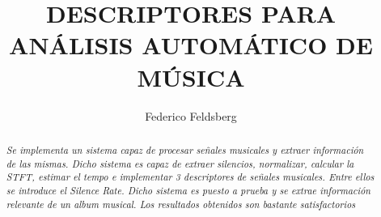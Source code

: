 \documentclass[]{article}
\title{\textbf{\LARGE{\textsf{DESCRIPTORES PARA ANÁLISIS AUTOMÁTICO DE MÚSICA}}}}
\date{} %
\begin{document}


\renewcommand{\headrulewidth}{0pt} %


\author[1]{Federico Feldsberg} %


\begin{minipage}[h]{\textwidth} %
    \maketitle
    \thispagestyle{fancy}
    \fancyhf{}
    \cfoot{\thepage}

\end{minipage}


\begin{abstract}

\textit{Se implementa un sistema capaz de procesar señales musicales y extraer información de las mismas.
Dicho sistema es capaz de extraer silencios, normalizar, calcular la STFT, estimar el tempo e implementar
3 descriptores de señales musicales. Entre ellos se introduce el Silence Rate.
Dicho sistema es puesto a prueba y se extrae información relevante
de un album musical. Los resultados obtenidos son bastante satisfactorios }

\end{abstract}

\vspace{0.8 cm}%
\end{document}
